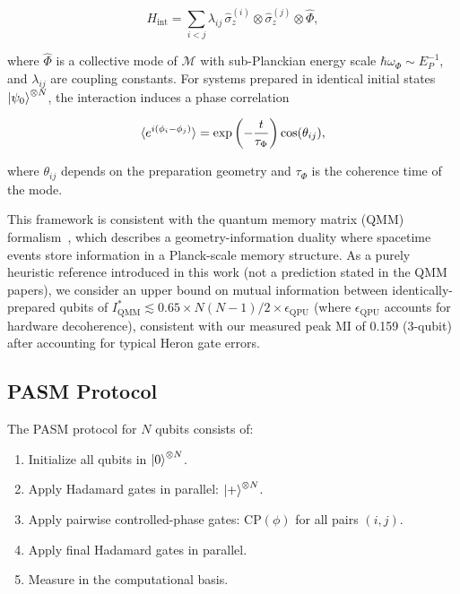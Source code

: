 ﻿\documentclass[12pt,a4paper]{article}
\begin{document}
\begin{equation}
H_{\text{int}} = \sum_{i<j} \lambda_{ij} \, \hat{\sigma}^{(i)}_z \otimes \hat{\sigma}^{(j)}_z \otimes \hat{\Phi},
\end{equation}

where $\hat{\Phi}$ is a collective mode of $\mathcal{M}$ with sub-Planckian energy scale $\hbar\omega_\Phi \sim E_P^{-1}$, and $\lambda_{ij}$ are coupling constants. For systems prepared in identical initial states $\ket{\psi_0}^{\otimes N}$, the interaction induces a phase correlation

\begin{equation}
\braket{e^{i(\phi_i - \phi_j)}} = \exp\left(-\frac{t}{\tau_\Phi}\right) \cos(\theta_{ij}),
\end{equation}

where $\theta_{ij}$ depends on the preparation geometry and $\tau_\Phi$ is the coherence time of the mode.

This framework is consistent with the quantum memory matrix (QMM) formalism~\cite{neukart2025}, which describes a geometry-information duality where spacetime events store information in a Planck-scale memory structure. As a purely heuristic reference introduced in this work (not a prediction stated in the QMM papers), we consider an upper bound on mutual information between identically-prepared qubits of $I_{\text{QMM}}^{*} \lesssim 0.65 \times N(N-1)/2 \times \epsilon_{\text{QPU}}$ (where $\epsilon_{\text{QPU}}$ accounts for hardware decoherence), consistent with our measured peak MI of 0.159 (3-qubit) after accounting for typical Heron gate errors.

\subsection{PASM Protocol}

The PASM protocol for $N$ qubits consists of:

\begin{enumerate}
    \item Initialize all qubits in $\ket{0}^{\otimes N}$.
    \item Apply Hadamard gates in parallel: $\ket{+}^{\otimes N}$.
    \item Apply pairwise controlled-phase gates: $\text{CP}(\phi)$ for all pairs $(i,j)$.
    \item Apply final Hadamard gates in parallel.
    \item Measure in the computational basis.
\end{enumerate}
\end{document}
